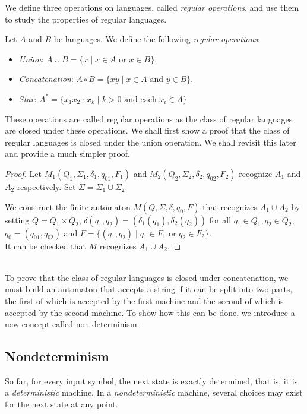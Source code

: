 We define three operations on languages, called \textit{regular operations}, and use them to study the properties of regular languages.

\begin{definition}
Let $A$ and $B$ be languages. We define the following \textit{regular operations}:
\begin{itemize}
    \item \textit{Union}: $A\cup B=\{x\mid x\in A \text{ or }x\in B\}$.
    \item \textit{Concatenation}: $A\circ B=\{xy\mid x\in A\text{ and }y\in B\}$.
    \item \textit{Star}: $A^*=\{x_1x_2\cdots x_k\mid k>0\text{ and each }x_i\in A\}$
\end{itemize}
\end{definition}

These operations are called regular operations as the class of regular languages are closed under these operations.
\vspace{3mm}
We shall first show a proof that the class of regular languages is closed under the union operation. We shall revisit this later and provide a much simpler proof.
\begin{proof}
Let $M_1(Q_1,\Sigma_1,\delta_1,q_{01},F_1)$ and $M_2(Q_2,\Sigma_2,\delta_2,q_{02},F_2)$ recognize $A_1$ and $A_2$ respectively. Set $\Sigma=\Sigma_1\cup\Sigma_2$.

We construct the finite automaton $M(Q,\Sigma,\delta,q_0,F)$ that recognizes $A_1\cup A_2$ by setting $Q=Q_1\times Q_2$, $\delta(q_1, q_2)=(\delta_1(q_1), \delta_2(q_2))$ for all $q_1\in Q_1,q_2\in Q_2$, $q_0=(q_{01}, q_{02})$ and $F=\{(q_1, q_2)\mid q_1\in F_1 \text{ or }q_2\in F_2\}$.\\
It can be checked that $M$ recognizes $A_1\cup A_2$.
\end{proof}
~\\
To prove that the class of regular languages is closed under concatenation, we must build an automaton that accepts a string if it can be split into two parts, the first of which is accepted by the first machine and the second of which is accepted by the second machine. To show how this can be done, we introduce a new concept called non-determinism.
\clearpage

\subsection{Nondeterminism}

So far, for every input symbol, the next state is exactly determined, that is, it is a \textit{deterministic} machine. In a \textit{nondeterministic} machine, several choices may exist for the next state at any point.

